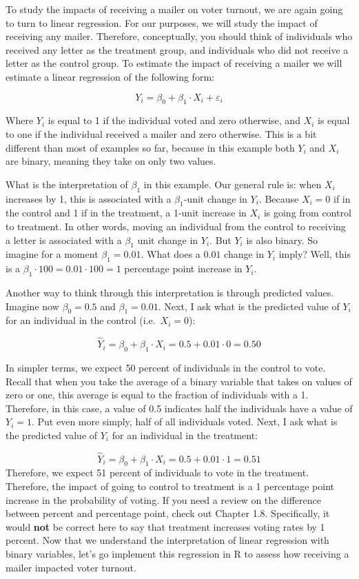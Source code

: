 \documentclass[
]{book}
\begin{document}
To study the impacts of receiving a mailer on voter turnout, we are again going to turn to linear regression. For our purposes, we will study the impact of receiving any mailer. Therefore, conceptually, you should think of individuals who received any letter as the treatment group, and individuals who did not receive a letter as the control group. To estimate the impact of receiving a mailer we will estimate a linear regression of the following form:

\[
Y_i = \beta_0 + \beta_1 \cdot X_i + \varepsilon_i
\]

Where \(Y_i\) is equal to 1 if the individual voted and zero otherwise, and \(X_i\) is equal to one if the individual received a mailer and zero otherwise. This is a bit different than most of examples so far, because in this example both \(Y_i\) and \(X_i\) are binary, meaning they take on only two values.

What is the interpretation of \(\beta_1\) in this example. Our general rule is: when \(X_i\) increases by 1, this is associated with a \(\beta_1\)-unit change in \(Y_i\). Because \(X_i=0\) if in the control and 1 if in the treatment, a 1-unit increase in \(X_i\) is going from control to treatment. In other words, moving an individual from the control to receiving a letter is associated with a \(\beta_1\) unit change in \(Y_i\). But \(Y_i\) is also binary. So imagine for a moment \(\beta_1=0.01\). What does a \(0.01\) change in \(Y_i\) imply? Well, this is a \(\beta_1 \cdot 100=0.01 \cdot 100 = 1\) percentage point increase in \(Y_i\).

Another way to think through this interpretation is through predicted values. Imagine now \(\beta_0=0.5\) and \(\beta_1=0.01\). Next, I ask what is the predicted value of \(Y_i\) for an individual in the control (i.e.~\(X_i=0\)):

\[
\hat{Y}_i = \beta_0 + \beta_1 \cdot X_i = 0.5 + 0.01 \cdot 0 = 0.50
\]

In simpler terms, we expect 50 percent of individuals in the control to vote. Recall that when you take the average of a binary variable that takes on values of zero or one, this average is equal to the fraction of individuals with a 1. Therefore, in this case, a value of 0.5 indicates half the individuals have a value of \(Y_i=1\). Put even more simply, half of all individuals voted. Next, I ask what is the predicted value of \(Y_i\) for an individual in the treatment:

\[
\hat{Y}_i = \beta_0 + \beta_1 \cdot X_i = 0.5 + 0.01 \cdot 1 = 0.51
\]
Therefore, we expect 51 percent of individuals to vote in the treatment. Therefore, the impact of going to control to treatment is a 1 percentage point increase in the probability of voting. If you need a review on the difference between percent and percentage point, check out Chapter 1.8. Specifically, it would \textbf{not} be correct here to say that treatment increases voting rates by 1 percent. Now that we understand the interpretation of linear regression with binary variables, let's go implement this regression in R to assess how receiving a mailer impacted voter turnout.
\end{document}

